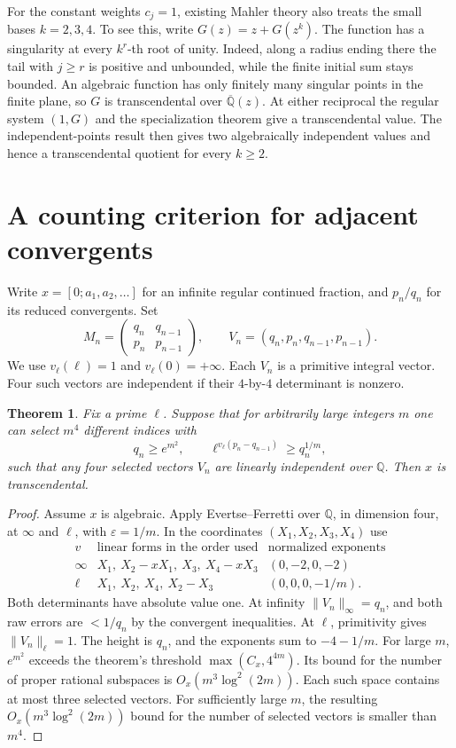 \documentclass[11pt,a4paper]{article}
\newcommand{\Q}{\mathbb Q}\newcommand{\Z}{\mathbb Z}\newcommand{\PP}{\mathbb P}\newcommand{\SL}{\mathrm{SL}}
\newtheorem{theorem}{Theorem}[section]
\begin{document}
For the constant weights $c_j=1$, existing Mahler theory also treats the
small bases $k=2,3,4$. To see this, write $G(z)=z+G(z^k)$.
The function has a singularity at every $k^r$-th root of unity. Indeed,
along a radius ending there the tail with $j\ge r$ is positive and
unbounded, while the finite initial sum stays bounded. An algebraic
function has only finitely many singular points in the finite plane,
so $G$ is transcendental over $\overline{\Q}(z)$.
At either reciprocal the regular system $(1,G)$ and the specialization
theorem \cite[Cor.~3.5]{af} give a transcendental value.
The independent-points result then gives two algebraically independent
values and hence a transcendental quotient for every $k\ge2$.


\section{A counting criterion for adjacent convergents}\label{sec:rankfour}
Write \(x=[0;a_1,a_2,\ldots]\) for an infinite regular continued fraction, and \(p_n/q_n\) for its reduced convergents. Set
\[
 M_n=\begin{pmatrix}q_n&q_{n-1}\\p_n&p_{n-1}\end{pmatrix},\qquad
 V_n=(q_n,p_n,q_{n-1},p_{n-1}).
\]
We use \(v_\ell(\ell)=1\) and \(v_\ell(0)=+\infty\). Each \(V_n\) is a primitive integral vector. Four such vectors are independent if their \(4\)-by-\(4\) determinant is nonzero.
\begin{theorem}\label{th:count}
Fix a prime \(\ell\). Suppose that for arbitrarily large integers \(m\) one can select \(m^4\) different indices with
\[
 q_n\ge e^{m^2},\qquad
 \ell^{v_\ell(p_n-q_{n-1})}\ge q_n^{1/m},
\]
such that any four selected vectors \(V_n\) are linearly independent over \(\Q\). Then \(x\) is transcendental.
\end{theorem}
\begin{proof}
Assume \(x\) is algebraic. Apply Evertse--Ferretti \cite[Thm.~3.1]{ef} over \(\Q\), in dimension four, at \(\infty\) and \(\ell\), with \(\varepsilon=1/m\). In the coordinates \((X_1,X_2,X_3,X_4)\) use
\[
\begin{array}{c|l|c}
v &\text{linear forms in the order used}&\text{normalized exponents}\\ \hline
\infty &X_1,\ X_2-xX_1,\ X_3,\ X_4-xX_3 &(0,-2,0,-2)\\
\ell &X_1,\ X_2,\ X_4,\ X_2-X_3 &(0,0,0,-1/m).
\end{array}
\]
Both determinants have absolute value one. At infinity \(\|V_n\|_\infty=q_n\), and both raw errors are \(<1/q_n\) by the convergent inequalities. At \(\ell\), primitivity gives \(\|V_n\|_\ell=1\). The height is \(q_n\), and the exponents sum to \(-4-1/m\). For large \(m\), \(e^{m^2}\) exceeds the theorem's threshold \(\max(C_x,4^{4m})\). Its bound for the number of proper rational subspaces is \(O_x(m^3\log^2(2m))\). Each such space contains at most three selected vectors. For sufficiently large \(m\), the resulting \(O_x(m^3\log^2(2m))\) bound for the number of selected vectors is smaller than \(m^4\).
\end{proof}
\end{document}
